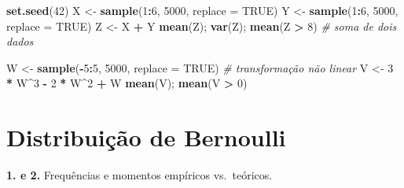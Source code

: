 \documentclass[
  portuguese,
  11pt,
  openany]{book}
\newenvironment{Shaded}{\begin{snugshade}}{\end{snugshade}}
\newcommand{\AttributeTok}[1]{\textcolor[rgb]{0.13,0.29,0.53}{#1}}
\newcommand{\CommentTok}[1]{\textcolor[rgb]{0.56,0.35,0.01}{\textit{#1}}}
\newcommand{\ConstantTok}[1]{\textcolor[rgb]{0.56,0.35,0.01}{#1}}
\newcommand{\DecValTok}[1]{\textcolor[rgb]{0.00,0.00,0.81}{#1}}
\newcommand{\FunctionTok}[1]{\textcolor[rgb]{0.13,0.29,0.53}{\textbf{#1}}}
\newcommand{\NormalTok}[1]{#1}
\newcommand{\OtherTok}[1]{\textcolor[rgb]{0.56,0.35,0.01}{#1}}
\newcommand{\SpecialCharTok}[1]{\textcolor[rgb]{0.81,0.36,0.00}{\textbf{#1}}}
\begin{document}
\begin{Shaded}
\begin{Highlighting}[]
\FunctionTok{set.seed}\NormalTok{(}\DecValTok{42}\NormalTok{)}
\NormalTok{X }\OtherTok{\textless{}{-}} \FunctionTok{sample}\NormalTok{(}\DecValTok{1}\SpecialCharTok{:}\DecValTok{6}\NormalTok{, }\DecValTok{5000}\NormalTok{, }\AttributeTok{replace =} \ConstantTok{TRUE}\NormalTok{)}
\NormalTok{Y }\OtherTok{\textless{}{-}} \FunctionTok{sample}\NormalTok{(}\DecValTok{1}\SpecialCharTok{:}\DecValTok{6}\NormalTok{, }\DecValTok{5000}\NormalTok{, }\AttributeTok{replace =} \ConstantTok{TRUE}\NormalTok{)}
\NormalTok{Z }\OtherTok{\textless{}{-}}\NormalTok{ X }\SpecialCharTok{+}\NormalTok{ Y}
\FunctionTok{mean}\NormalTok{(Z); }\FunctionTok{var}\NormalTok{(Z); }\FunctionTok{mean}\NormalTok{(Z }\SpecialCharTok{\textgreater{}} \DecValTok{8}\NormalTok{)                }\CommentTok{\# soma de dois dados}

\NormalTok{W }\OtherTok{\textless{}{-}} \FunctionTok{sample}\NormalTok{(}\SpecialCharTok{{-}}\DecValTok{5}\SpecialCharTok{:}\DecValTok{5}\NormalTok{, }\DecValTok{5000}\NormalTok{, }\AttributeTok{replace =} \ConstantTok{TRUE}\NormalTok{)     }\CommentTok{\# transformação não linear}
\NormalTok{V }\OtherTok{\textless{}{-}} \DecValTok{3} \SpecialCharTok{*}\NormalTok{ W}\SpecialCharTok{\^{}}\DecValTok{3} \SpecialCharTok{{-}} \DecValTok{2} \SpecialCharTok{*}\NormalTok{ W}\SpecialCharTok{\^{}}\DecValTok{2} \SpecialCharTok{+}\NormalTok{ W}
\FunctionTok{mean}\NormalTok{(V); }\FunctionTok{mean}\NormalTok{(V }\SpecialCharTok{\textgreater{}} \DecValTok{0}\NormalTok{)}
\end{Highlighting}
\end{Shaded}

\section{Distribuição de Bernoulli}\label{distribuiuxe7uxe3o-de-bernoulli-1}

\textbf{1. e 2.} Frequências e momentos empíricos vs.~teóricos.
\end{document}
